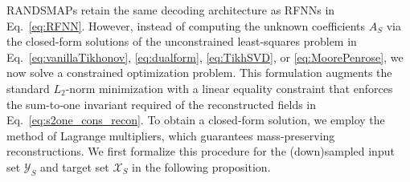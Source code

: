 \documentclass{article}
\begin{document}
RANDSMAPs retain the same decoding architecture as RFNNs in Eq.~\eqref{eq:RFNN}. However, instead of computing the unknown coefficients $A_S$ via the closed-form solutions of the unconstrained least-squares problem in Eq.~\eqref{eq:vanillaTikhonov}, \eqref{eq:dualform}, \eqref{eq:TikhSVD}, or \eqref{eq:MoorePenrose}, we now solve a constrained optimization problem. This formulation augments the standard $L_2$-norm minimization with a linear equality constraint that enforces the sum‑to‑one invariant required of the reconstructed fields in Eq.~\eqref{eq:s2one_cons_recon}. To obtain a closed‑form solution, we employ the method of Lagrange multipliers, which guarantees mass-preserving reconstructions. We first formalize this procedure for the (down)sampled input set $\mathcal{Y}_S$ and target set $\mathcal{X}_S$ in the following proposition.
\end{document}
